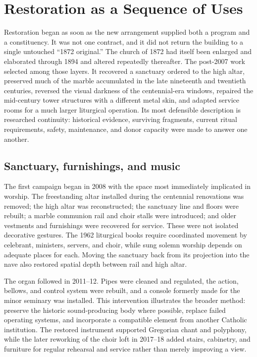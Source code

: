 \section{Restoration as a Sequence of Uses}

Restoration began as soon as the new arrangement supplied both a program and a constituency. It was not one contract, and it did not return the building to a single untouched ``1872 original.'' The church of 1872 had itself been enlarged and elaborated through 1894 and altered repeatedly thereafter. The post-2007 work selected among those layers. It recovered a sanctuary ordered to the high altar, preserved much of the marble accumulated in the late nineteenth and twentieth centuries, reversed the visual darkness of the centennial-era windows, repaired the mid-century tower structures with a different metal skin, and adapted service rooms for a much larger liturgical operation. Its most defensible description is researched continuity: historical evidence, surviving fragments, current ritual requirements, safety, maintenance, and donor capacity were made to answer one another.

\subsection{Sanctuary, furnishings, and music}

The first campaign began in 2008 with the space most immediately implicated in worship. The freestanding altar installed during the centennial renovations was removed; the high altar was reconstructed; the sanctuary line and floors were rebuilt; a marble communion rail and choir stalls were introduced; and older vestments and furnishings were recovered for service. These were not isolated decorative gestures. The 1962 liturgical books require coordinated movement by celebrant, ministers, servers, and choir, while sung solemn worship depends on adequate places for each. Moving the sanctuary back from its projection into the nave also restored spatial depth between rail and high altar.

The organ followed in 2011--12. Pipes were cleaned and regulated, the action, bellows, and control system were rebuilt, and a console formerly made for the minor seminary was installed. This intervention illustrates the broader method: preserve the historic sound-producing body where possible, replace failed operating systems, and incorporate a compatible element from another Catholic institution. The restored instrument supported Gregorian chant and polyphony, while the later reworking of the choir loft in 2017--18 added stairs, cabinetry, and furniture for regular rehearsal and service rather than merely improving a view.


